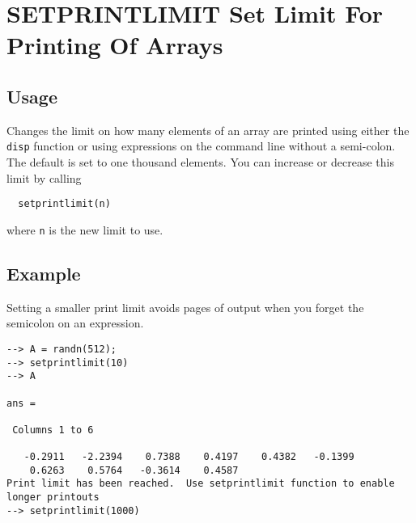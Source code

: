 \section{SETPRINTLIMIT Set Limit For Printing Of Arrays}

\subsection{Usage}

Changes the limit on how many elements of an array are printed
using either the \verb|disp| function or using expressions on the
command line without a semi-colon.  The default is set to 
one thousand elements.  You can increase or decrease this
limit by calling
\begin{verbatim}
  setprintlimit(n)
\end{verbatim}
where \verb|n| is the new limit to use.
\subsection{Example}

Setting a smaller print limit avoids pages of output when you forget the semicolon on an expression.
\begin{verbatim}
--> A = randn(512);
--> setprintlimit(10)
--> A

ans = 

 Columns 1 to 6

   -0.2911   -2.2394    0.7388    0.4197    0.4382   -0.1399 
    0.6263    0.5764   -0.3614    0.4587
Print limit has been reached.  Use setprintlimit function to enable longer printouts
--> setprintlimit(1000)
\end{verbatim}
